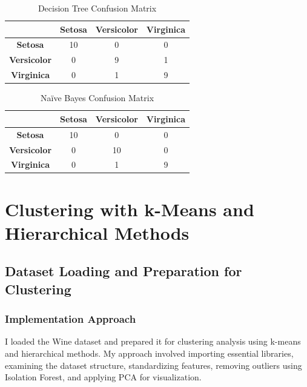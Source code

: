 \documentclass[12pt,a4paper]{article}
\newcommand{\tablealtrow}{\rowcolor{tablealt1}}
\begin{document}
\begin{table}[h!]
\centering
\renewcommand{\arraystretch}{1.3}
\begin{tabular}{|c|c|c|c|}
\hline
\rowcolor{tableheader} & \textcolor{headertext}{\textbf{Setosa}} & \textcolor{headertext}{\textbf{Versicolor}} & \textcolor{headertext}{\textbf{Virginica}} \\
\hline
\tablealtrow \textbf{Setosa} & 10 & 0 & 0 \\
\rowcolor{tablealt2} \textbf{Versicolor} & 0 & 9 & 1 \\
\tablealtrow \textbf{Virginica} & 0 & 1 & 9 \\
\hline
\end{tabular}
\caption{Decision Tree Confusion Matrix}
\end{table}

\begin{table}[h!]
\centering
\renewcommand{\arraystretch}{1.3}
\begin{tabular}{|c|c|c|c|}
\hline
\rowcolor{tableheader} & \textcolor{headertext}{\textbf{Setosa}} & \textcolor{headertext}{\textbf{Versicolor}} & \textcolor{headertext}{\textbf{Virginica}} \\
\hline
\tablealtrow \textbf{Setosa} & 10 & 0 & 0 \\
\rowcolor{tablealt2} \textbf{Versicolor} & 0 & 10 & 0 \\
\tablealtrow \textbf{Virginica} & 0 & 1 & 9 \\
\hline
\end{tabular}
\caption{Na\"{i}ve Bayes Confusion Matrix}
\end{table}

\section{Clustering with k-Means and Hierarchical Methods}

\subsection{Dataset Loading and Preparation for Clustering}

\subsubsection{Implementation Approach}
I loaded the Wine dataset and prepared it for clustering analysis using k-means and hierarchical methods. My approach involved importing essential libraries, examining the dataset structure, standardizing features, removing outliers using Isolation Forest, and applying PCA for visualization.
\end{document}
